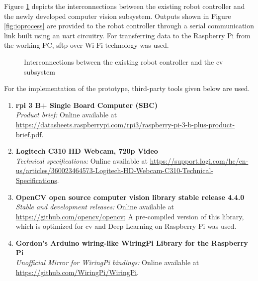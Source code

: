 \documentclass[a4paper,12pt]{report}%
\begin{document}
Figure \ref{fig:cvsubsys} depicts the interconnections between the existing robot controller and the newly developed computer vision subsystem. Outputs shown in Figure \ref{fig:ioprocess} are provided to the robot controller through a serial communication link built using an \ac{uart} circuitry. For transferring data to the Raspberry Pi from the working PC, \ac{sftp} over Wi-Fi technology was used.

\begin{figure}[H]
	\centering
	
	\caption{Interconnections between the existing robot controller and the \ac{cv} subsystem}
	\label{fig:cvsubsys}
\end{figure}

For the implementation of the prototype, third-party tools given below are used.\\

\begin{enumerate}[1.]
	\item \textbf{\ac{rpi} 3 B+ Single Board Computer (SBC)}\\
	\textit{Product brief:} Online available at \url{https://datasheets.raspberrypi.com/rpi3/raspberry-pi-3-b-plus-product-brief.pdf}.
	
	\item \textbf{Logitech C310 HD Webcam, 720p Video}\\
	\textit{Technical specifications:} Online available at \url{https://support.logi.com/hc/en-us/articles/360023464573-Logitech-HD-Webcam-C310-Technical-Specifications}.
	
	\item \textbf{OpenCV open source computer vision library stable release 4.4.0}\cite{opencv_library} \\
	\textit{Stable and development releases:} Online available at \url{https://github.com/opencv/opencv}; A pre-compiled version of this library, which is optimized for \ac{cv} and Deep Learning on Raspberry Pi was used.
	
	\item \textbf{Gordon's Arduino wiring-like WiringPi Library for the Raspberry Pi}\cite{wiringpi} \\
	\textit{Unofficial Mirror for WiringPi bindings:} Online available at \url{https://github.com/WiringPi/WiringPi}.
	
\end{enumerate}
\end{document}
